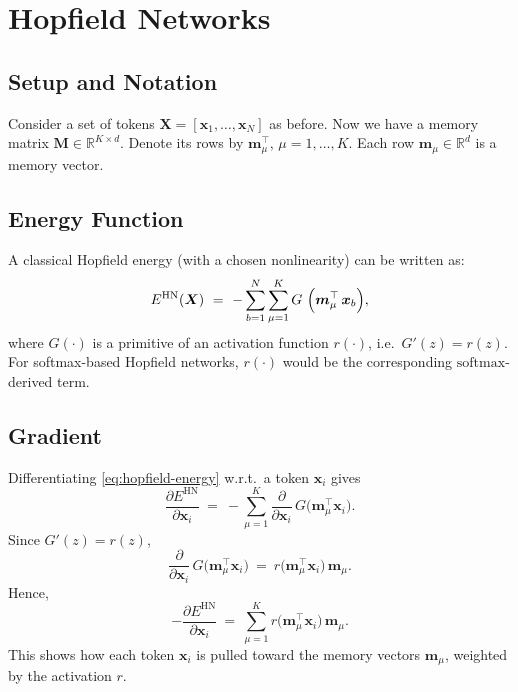 \documentclass{article}
\begin{document}
\bigskip

\section{Hopfield Networks}

\subsection{Setup and Notation}

Consider a set of tokens \(\bm{X} = [\bm{x}_1, \ldots, \bm{x}_N]\) as before. Now we have a memory matrix 
\(\bm{M} \in \mathbb{R}^{K \times d}\). Denote its rows by \(\bm{m}_\mu^\top\), \(\mu = 1,\ldots,K\). Each row \(\bm{m}_\mu \in \mathbb{R}^d\) is a memory vector.

\subsection{Energy Function}

A classical Hopfield energy (with a chosen nonlinearity) can be written as:
\begin{equation}
E^{\text{HN}}(\bm{X}) 
~=~
-\sum_{b=1}^N \sum_{\mu=1}^K 
G\ \Bigl(\bm{m}_\mu^\top\,\bm{x}_b\Bigr),
\label{eq:hopfield-energy}
\end{equation}
where \(G(\cdot)\) is a primitive of an activation function \(r(\cdot)\), i.e.\ \(G'(z) = r(z)\). For softmax-based Hopfield networks, \(r(\cdot)\) would be the corresponding \(\mathrm{softmax}\)-derived term.

\subsection{Gradient}

Differentiating \eqref{eq:hopfield-energy} w.r.t.\ a token \(\bm{x}_i\) gives
\[
\frac{\partial E^{\text{HN}}}{\partial \bm{x}_i}
~=~
-\sum_{\mu=1}^K
\frac{\partial}{\partial \bm{x}_i} \,
G \bigl(\bm{m}_\mu^\top \bm{x}_i\bigr).
\]
Since \(G'(z) = r(z)\),
\[
\frac{\partial}{\partial \bm{x}_i}\,G \bigl(\bm{m}_\mu^\top \bm{x}_i\bigr)
~=~
r \bigl(\bm{m}_\mu^\top \bm{x}_i\bigr)\,\bm{m}_\mu.
\]
Hence,
\[
-\frac{\partial E^{\text{HN}}}{\partial \bm{x}_i}
~=~
\sum_{\mu=1}^K
r \bigl(\bm{m}_\mu^\top \bm{x}_i\bigr)\,\bm{m}_\mu.
\]
This shows how each token \(\bm{x}_i\) is pulled toward the memory vectors \(\bm{m}_\mu\), weighted by the activation \(r\).

\bigskip
\end{document}

